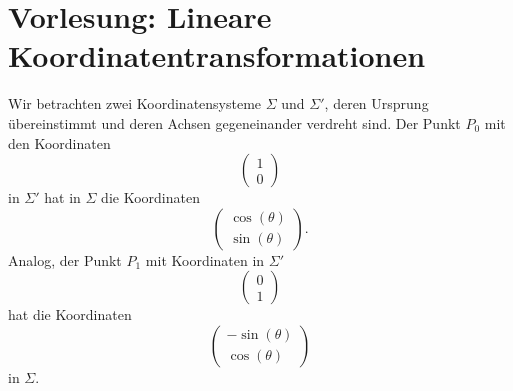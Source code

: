 
\section{Vorlesung: Lineare Koordinatentransformationen}
Wir betrachten zwei Koordinatensysteme $\Sigma$ und $\Sigma'$, deren Ursprung übereinstimmt und deren Achsen gegeneinander verdreht sind.
\figbox
Der Punkt $P_0$ mit den Koordinaten
\begin{equation}
  \begin{pmatrix}
    1 \\ 0
  \end{pmatrix}
\end{equation}
in $\Sigma'$ hat in $\Sigma$ die Koordinaten
\begin{equation}
  \begin{pmatrix}
    \cos(\theta) \\ \sin(\theta)
  \end{pmatrix}.
\end{equation}
Analog, der Punkt $P_1$ mit Koordinaten in $\Sigma'$
\begin{equation}
  \begin{pmatrix}
    0 \\ 1
  \end{pmatrix}
\end{equation}
hat die Koordinaten
\begin{equation}
  \begin{pmatrix}
    -\sin(\theta) \\ \cos(\theta)
  \end{pmatrix}
\end{equation}
in $\Sigma$.

